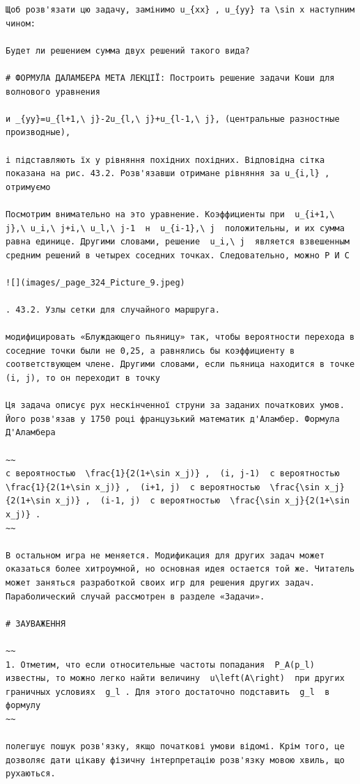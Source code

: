 \documentclass[
  ukrainian,
]{article}
\begin{document}
\begin{verbatim}
Щоб розв'язати цю задачу, замінимо u_{xx} , u_{yy} та \sin x наступним чином:

Будет ли решением сумма двух решений такого вида?

# ФОРМУЛА ДАЛАМБЕРА МЕТА ЛЕКЦІЇ: Построить решение задачи Коши для волнового уравнения

и _{yy}=u_{l+1,\ j}-2u_{l,\ j}+u_{l-1,\ j}, (центральные разностные производные),

і підставляють їх у рівняння похідних похідних. Відповідна сітка показана на рис. 43.2. Розв'язавши отримане рівняння за u_{i,l} , отримуємо

Посмотрим внимательно на это уравнение. Коэффициенты при  u_{i+1,\ j},\ u_i,\ j+i,\ u_l,\ j-1  н  u_{i-1},\ j  положительны, и их сумма равна единице. Другими словами, решение  u_i,\ j  является взвешенным средним решений в четырех соседних точках. Следовательно, можно Р И С

![](images/_page_324_Picture_9.jpeg)

. 43.2. Узлы сетки для случайного маршруга.

модифицировать «Блуждающего пьяницу» так, чтобы вероятности перехода в соседние точки были не 0,25, а равнялись бы коэффициенту в соответствующем члене. Другими словами, если пьяница находится в точке (i, j), то он переходит в точку

Ця задача описує рух нескінченної струни за заданих початкових умов. Його розв'язав у 1750 році французький математик д'Аламбер. Формула Д'Аламбера

~~
с вероятностью  \frac{1}{2(1+\sin x_j)} ,  (i, j-1)  с вероятностью  \frac{1}{2(1+\sin x_j)} ,  (i+1, j)  с вероятностью  \frac{\sin x_j}{2(1+\sin x_j)} ,  (i-1, j)  с вероятностью  \frac{\sin x_j}{2(1+\sin x_j)} .
~~

В остальном игра не меняется. Модификация для других задач может оказаться более хитроумной, но основная идея остается той же. Читатель может заняться разработкой своих игр для решения других задач. Параболический случай рассмотрен в разделе «Задачи».

# ЗАУВАЖЕННЯ

~~
1. Отметим, что если относительные частоты попадания  P_A(p_l)  известны, то можно легко найти величину  u\left(A\right)  при других граничных условиях  g_l . Для этого достаточно подставить  g_l  в формулу
~~

полегшує пошук розв'язку, якщо початкові умови відомі. Крім того, це дозволяє дати цікаву фізичну інтерпретацію розв'язку мовою хвиль, що рухаються.


\end{verbatim}
\end{document}
